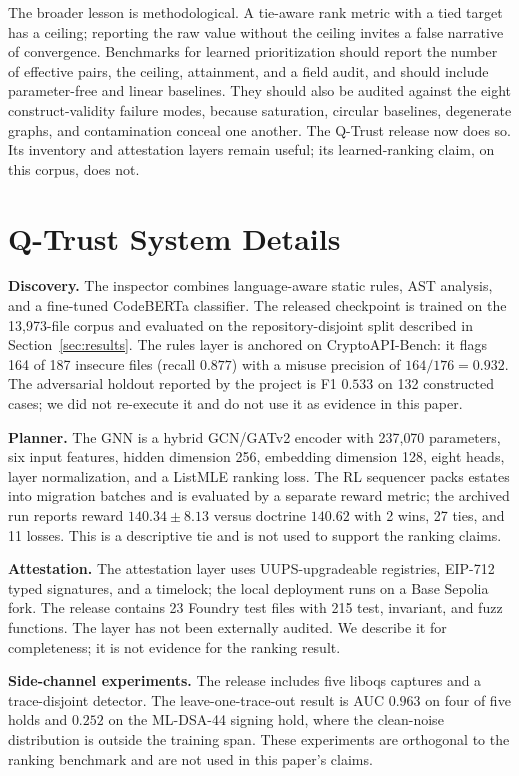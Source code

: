 \documentclass[conference,10pt]{IEEEtran}
\begin{document}
The broader lesson is methodological. A tie-aware rank metric with a tied target has a ceiling;
reporting the raw value without the ceiling invites a false narrative of convergence. Benchmarks
for learned prioritization should report the number of effective pairs, the ceiling, attainment,
and a field audit, and should include parameter-free and linear baselines. They should also be
audited against the eight construct-validity failure modes, because saturation, circular
baselines, degenerate graphs, and contamination conceal one another. The Q-Trust release now
does so. Its inventory and attestation layers remain useful; its learned-ranking claim, on this
corpus, does not.

\appendix

\section{Q-Trust System Details}
\label{app:system}

\textbf{Discovery.} The inspector combines language-aware static rules, AST analysis, and a
fine-tuned CodeBERTa classifier. The released checkpoint is trained on the 13{,}973-file corpus
and evaluated on the repository-disjoint split described in Section~\ref{sec:results}. The rules
layer is anchored on CryptoAPI-Bench: it flags 164 of 187 insecure files (recall $0.877$) with a
misuse precision of $164/176=0.932$. The adversarial holdout reported by the project is F1
$0.533$ on 132 constructed cases; we did not re-execute it and do not use it as evidence in this
paper.

\textbf{Planner.} The GNN is a hybrid GCN/GATv2 encoder with 237{,}070 parameters, six input
features, hidden dimension 256, embedding dimension 128, eight heads, layer normalization, and a
ListMLE ranking loss. The RL sequencer packs estates into migration batches and is evaluated by a
separate reward metric; the archived run reports reward $140.34\pm8.13$ versus doctrine $140.62$
with 2 wins, 27 ties, and 11 losses. This is a descriptive tie and is not used to support the
ranking claims.

\textbf{Attestation.} The attestation layer uses UUPS-upgradeable registries, EIP-712 typed
signatures, and a timelock; the local deployment runs on a Base Sepolia fork. The release
contains 23 Foundry test files with 215 test, invariant, and fuzz functions. The layer has not
been externally audited. We describe it for completeness; it is not evidence for the ranking
result.

\textbf{Side-channel experiments.} The release includes five liboqs captures and a
trace-disjoint detector. The leave-one-trace-out result is AUC $0.963$ on four of five holds and
$0.252$ on the ML-DSA-44 signing hold, where the clean-noise distribution is outside the
training span. These experiments are orthogonal to the ranking benchmark and are not used in this
paper's claims.
\end{document}
